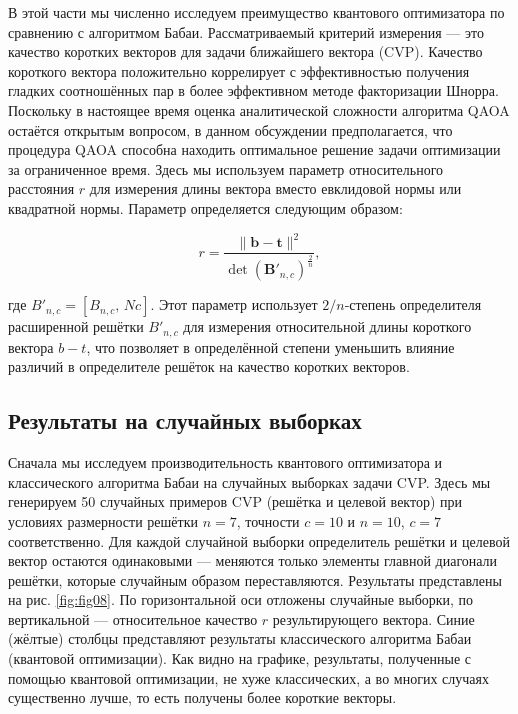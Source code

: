 
В этой части мы численно исследуем преимущество квантового оптимизатора по
сравнению с алгоритмом Бабаи. Рассматриваемый критерий измерения — это качество
коротких векторов для задачи ближайшего вектора (CVP). Качество короткого
вектора положительно коррелирует с эффективностью получения гладких
соотношённых пар в более эффективном методе факторизации Шнорра. Поскольку в
настоящее время оценка аналитической сложности алгоритма QAOA остаётся открытым
вопросом, в данном обсуждении предполагается, что процедура QAOA способна
находить оптимальное решение задачи оптимизации за ограниченное время. Здесь мы
используем параметр относительного расстояния $r$ для измерения длины вектора
вместо евклидовой нормы или квадратной нормы. Параметр определяется следующим
образом:

\begin{equation}
r = \frac{\lVert \mathbf{b} - \mathbf{t} \rVert^2}{\det(\mathbf{B}'_{n,c})^{\frac{2}{n}}},
\end{equation}

\noindent где $B'_{n,c} = [B_{n,c},\, N c]$. Этот параметр использует $2/n$‑степень
определителя расширенной решётки $B'_{n,c}$ для измерения относительной длины
короткого вектора $b - t$, что позволяет в определённой степени уменьшить
влияние различий в определителе решёток на качество коротких векторов.

\subsection*{Результаты на случайных выборках}

Сначала мы исследуем производительность квантового оптимизатора и классического
алгоритма Бабаи на случайных выборках задачи CVP. Здесь мы генерируем 50
случайных примеров CVP (решётка и целевой вектор) при условиях размерности
решётки $n = 7$, точности $c = 10$ и $n = 10$, $c = 7$ соответственно. Для
каждой случайной выборки определитель решётки и целевой вектор остаются
одинаковыми — меняются только элементы главной диагонали решётки, которые
случайным образом переставляются. Результаты представлены на рис.
\ref{fig:fig08}. По горизонтальной оси отложены случайные выборки, по
вертикальной — относительное качество $r$ результирующего вектора. Синие
(жёлтые) столбцы представляют результаты классического алгоритма Бабаи
(квантовой оптимизации). Как видно на графике, результаты, полученные с помощью
квантовой оптимизации, не хуже классических, а во многих случаях существенно
лучше, то есть получены более короткие векторы.


